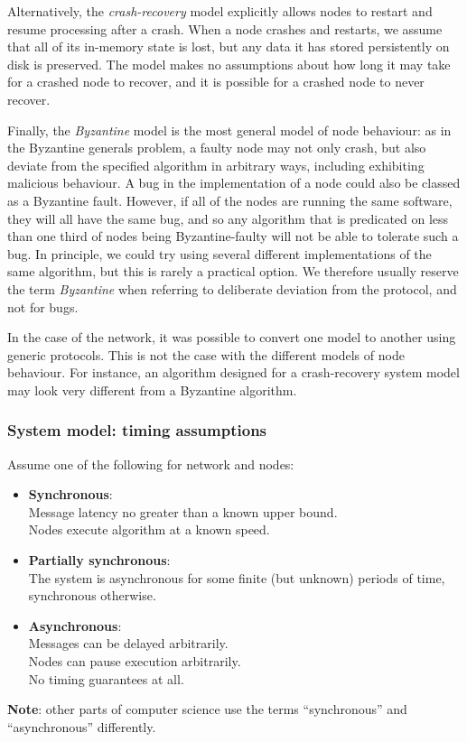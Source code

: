 Alternatively, the \emph{crash-recovery} model explicitly allows nodes to restart and resume processing after a crash.
When a node crashes and restarts, we assume that all of its in-memory state is lost, but any data it has stored persistently on disk is preserved.
The model makes no assumptions about how long it may take for a crashed node to recover, and it is possible for a crashed node to never recover.

Finally, the \emph{Byzantine} model is the most general model of node behaviour: as in the Byzantine generals problem, a faulty node may not only crash, but also deviate from the specified algorithm in arbitrary ways, including exhibiting malicious behaviour.
A bug in the implementation of a node could also be classed as a Byzantine fault.
However, if all of the nodes are running the same software, they will all have the same bug, and so any algorithm that is predicated on less than one third of nodes being Byzantine-faulty will not be able to tolerate such a bug.
In principle, we could try using several different implementations of the same algorithm, but this is rarely a practical option.
We therefore usually reserve the term \emph{Byzantine} when referring to deliberate deviation from the protocol, and not for bugs.

In the case of the network, it was possible to convert one model to another using generic protocols.
This is not the case with the different models of node behaviour.
For instance, an algorithm designed for a crash-recovery system model may look very different from a Byzantine algorithm.


\begin{frame}
    \label{s:model-synchrony}
    \frametitle{System model: timing assumptions}
    Assume one of the following for network and nodes:
    \begin{itemize}
        \item \textbf{Synchronous}:\\
            Message latency no greater than a known upper bound.\\
            Nodes execute algorithm at a known speed.\pause
        \item \textbf{Partially synchronous}:\\
            The system is asynchronous for some finite (but unknown) periods of time, synchronous otherwise.\pause
        \item \textbf{Asynchronous}:\\
            Messages can be delayed arbitrarily.\\
            Nodes can pause execution arbitrarily.\\
            No timing guarantees at all.\\[1em]
    \end{itemize}
    \textbf{Note}: other parts of computer science use the terms ``synchronous'' and ``asynchronous'' differently.
\end{frame}
\label{l:model-synchrony}

